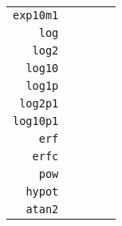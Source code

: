 \begin{table}
\begin{tabular}{r|rr|rr}
\texttt{exp10m1} &  &  &  &  \\
\texttt{log} &  &  &  &  \\
\texttt{log2} &  &  &  &  \\
\texttt{log10} &  &  &  &  \\
\texttt{log1p} &  &  &  &  \\
\texttt{log2p1} &  &  &  &  \\
\texttt{log10p1} &  &  &  &  \\
\texttt{erf} &  &  &  &  \\
\texttt{erfc} &  &  &  &  \\
\texttt{pow} &  &  &  &  \\
\texttt{hypot} &  &  &  &  \\
\texttt{atan2} &  &  &  &  \\
\end{tabular}
\end{table}
